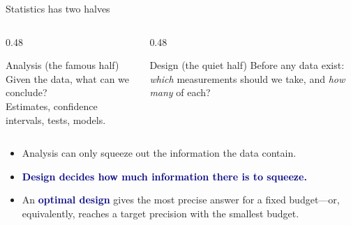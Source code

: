 \documentclass[aspectratio=169,10pt]{beamer}
\newcommand{\key}[1]{\textcolor{navy}{\textbf{#1}}}
\begin{document}
\begin{frame}{Statistics has two halves}
  \begin{columns}[T]
    \begin{column}{0.48\textwidth}
      \begin{block}{Analysis (the famous half)}
        Given the data, what can we conclude?\\
        Estimates, confidence intervals, tests, models.
      \end{block}
    \end{column}
    \begin{column}{0.48\textwidth}
      \begin{alertblock}{Design (the quiet half)}
        Before any data exist: \emph{which} measurements should we take, and \emph{how many} of each?
      \end{alertblock}
    \end{column}
  \end{columns}
  \vspace{1em}
  \begin{itemize}
    \item Analysis can only squeeze out the information the data contain.
    \item \key{Design decides how much information there is to squeeze.}
    \item An \key{optimal design} gives the most precise answer for a fixed budget---or,
          equivalently, reaches a target precision with the smallest budget.
  \end{itemize}
\end{frame}
\end{document}

